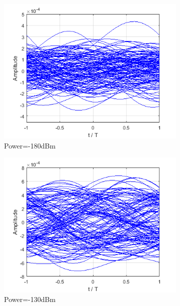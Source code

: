 \documentclass[a4paper]{article}
\begin{document}
\begin{figure}[H]
\centering
\begin{subfigure}{.3\linewidth}
\includegraphics[width=\linewidth]{eyeclosed.png}
\caption{Power=-180dBm}
\end{subfigure}
\begin{subfigure}{.3\linewidth}
\includegraphics[width=\linewidth]{eyepartial.png}
\caption{Power=-130dBm}
\end{subfigure}
\begin{subfigure}{.3\linewidth}

\end{subfigure}
\end{figure}
\end{document}
